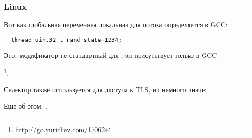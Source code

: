 \subsubsection{Linux}

Вот как глобальная переменная локальная для потока определяется в GCC:

\begin{lstlisting}
__thread uint32_t rand_state=1234;
\end{lstlisting}

Этот модификатор не стандартный для \CCpp, он присутствует только в GCC

\footnote{\url{http://go.yurichev.com/17062}}.

Селектор  также используется для доступа к \ac{TLS}, но немного иначе:




Еще об этом: \DrepperTLS.

